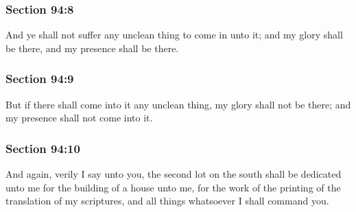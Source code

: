 	\subsubsection{Section 94:8} %
		\label{DC94-8}

		And ye shall not suffer any unclean thing to come in unto it; and my glory shall be there, and my presence shall be there.


	\subsubsection{Section 94:9} %
		\label{DC94-9}

		But if there shall come into it any unclean thing, my glory shall not be there; and my presence shall not come into it.


	\subsubsection{Section 94:10} %
		\label{DC94-10}

		And again, verily I say unto you, the second lot on the south shall be dedicated unto me for the building of a house unto me, for the work of the printing of the translation of my scriptures, and all things whatsoever I shall command you.


